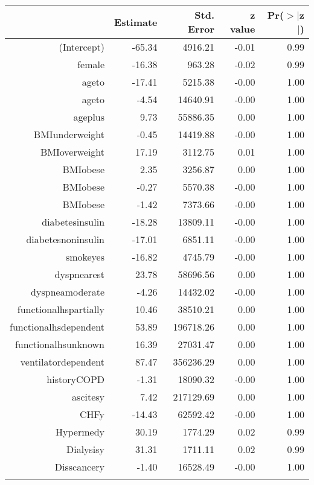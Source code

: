 \bigskip\bigskip
\centering
\begin{tabular}{rrrrr}
  \hline
 & Estimate & Std. Error & z value & Pr($>$$|$z$|$) \\ 
  \hline
(Intercept) & -65.34 & 4916.21 & -0.01 & 0.99 \\ 
  female & -16.38 & 963.28 & -0.02 & 0.99 \\ 
  age\-65\-to\-74 & -17.41 & 5215.38 & -0.00 & 1.00 \\ 
  age\-75\-to\-84 & -4.54 & 14640.91 & -0.00 & 1.00 \\ 
  age\-85\-plus & 9.73 & 55886.35 & 0.00 & 1.00 \\ 
  BMI\-underweight & -0.45 & 14419.88 & -0.00 & 1.00 \\ 
  BMI\-overweight & 17.19 & 3112.75 & 0.01 & 1.00 \\ 
  BMI\-obese\-1 & 2.35 & 3256.87 & 0.00 & 1.00 \\ 
  BMI\-obese\-2 & -0.27 & 5570.38 & -0.00 & 1.00 \\ 
  BMI\-obese\-3 & -1.42 & 7373.66 & -0.00 & 1.00 \\ 
  diabetes\-insulin & -18.28 & 13809.11 & -0.00 & 1.00 \\ 
  diabetes\-noninsulin & -17.01 & 6851.11 & -0.00 & 1.00 \\ 
  smoke\-yes & -16.82 & 4745.79 & -0.00 & 1.00 \\ 
  dyspnea\-rest & 23.78 & 58696.56 & 0.00 & 1.00 \\ 
  dyspnea\-moderate & -4.26 & 14432.02 & -0.00 & 1.00 \\ 
  functional\-hs\-partially & 10.46 & 38510.21 & 0.00 & 1.00 \\ 
  functional\-hs\-dependent & 53.89 & 196718.26 & 0.00 & 1.00 \\ 
  functional\-hs\-unknown & 16.39 & 27031.47 & 0.00 & 1.00 \\ 
  ventilator\-dependent & 87.47 & 356236.29 & 0.00 & 1.00 \\ 
  history\-COPD & -1.31 & 18090.32 & -0.00 & 1.00 \\ 
  ascites\-y & 7.42 & 217129.69 & 0.00 & 1.00 \\ 
  CHF\-y & -14.43 & 62592.42 & -0.00 & 1.00 \\ 
  Hyper\-med\-y & 30.19 & 1774.29 & 0.02 & 0.99 \\ 
  Dialysis\-y & 31.31 & 1711.11 & 0.02 & 0.99 \\ 
  Diss\-cancer\-y & -1.40 & 16528.49 & -0.00 & 1.00 \\ 
$$
\end{tabular}
